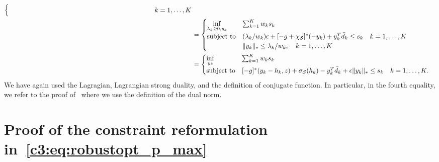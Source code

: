 \begin{equation*}
\begin{aligned}
\begin{cases}
	&\hspace{7cm}\quad k = 1,\dots,K
\end{cases}\\
&= \begin{cases}
	\underset{\lambda_k \geq 0, y_k}{\inf} &  \sum_{k=1} ^K  w_k s_k \\
	\mbox{subject to} & (\lambda_k/w_k)\epsilon + [-g +\chi_{\supp}]^*(-y_k) + y_k^T\bar{d}_k \le s_k \quad k = 1,\dots,K\\
	& \|y_k\|_* \leq \lambda_k/w_k,\quad k = 1,\dots,K
\end{cases}\\
&= \reviewChanges{\begin{cases}
	\underset{y_k}{\inf} &  \sum_{k=1} ^K  w_k s_k \\
	\mbox{subject to} &  [-g]^*(y_{k} - h_{k},z) + \sigma_{\supp}(h_{k})  - y_k^T\bar{d}_k  + \epsilon\|y_k\|_* \le s_k \quad k = 1,\dots,K.\\
\end{cases}}\\
\end{aligned}
\end{equation*}
We have again used the Lagragian, Lagrangian strong duality, and the definition of conjugate function. In particular, in the fourth equality, we refer to the proof of~\cite[Theorem 4.2]{mohajerin_esfahani_data-driven_2018} where we use the definition of the dual norm. 



\section{Proof of the constraint reformulation in~\eqref{c3:eq:robustopt_p_max}}

